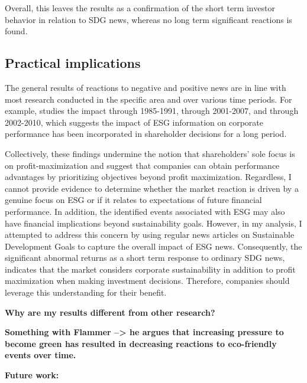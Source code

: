 Overall, this leaves the results as a confirmation of the short term investor behavior in relation to SDG news, whereas no long term significant reactions is found. 



\subsection{Practical implications}

The general results of reactions to negative and positive news are in line with most research conducted in the specific area and over various time periods. For example, \cite{klassen1996impact} studies the impact through 1985-1991, \cite{kruger2015corporate} through 2001-2007, and \cite{Blancard_ESG_sentiment} through 2002-2010, which suggests the impact of ESG information on corporate performance has been incorporated in shareholder decisions for a long period. 

Collectively, these findings undermine the notion that shareholders' sole focus is on profit-maximization and suggest that companies can obtain performance advantages by prioritizing objectives beyond profit maximization. Regardless, I cannot provide evidence to determine whether the market reaction is driven by a genuine focus on ESG or if it relates to expectations of future financial performance. In addition, the identified events associated with ESG may also have financial implications beyond sustainability goals. However, in my analysis, I attempted to address this concern by using regular news articles on Sustainable Development Goals to capture the overall impact of ESG news. Consequently, the significant abnormal returns as a short term response to ordinary SDG news, indicates that the market considers corporate sustainability in addition to profit maximization when making investment decisions. Therefore, companies should leverage this understanding for their benefit.


\textbf{Why are my results different from other research?}

\textbf{Something with Flammer --> he argues that increasing pressure to become green has resulted in decreasing reactions to eco-friendly events over time.}


\textbf{Future work:}
